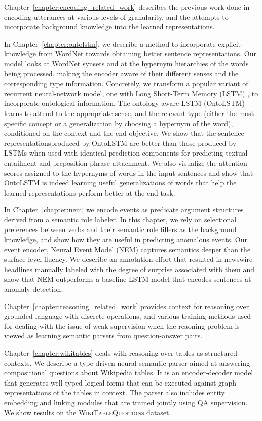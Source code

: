 Chapter~\ref{chapter:encoding_related_work} describes the previous work done in encoding utterances
at various levels of granularity, and the attempts to incorporate background knowledge into
the learned representations.

In Chapter~\ref{chapter:ontolstm}, we describe a method to incorporate explicit knowledge from
WordNet towards obtaining better sentence representations. Our model looks at WordNet synsets and at
the hypernym hierarchies of the words being processed, making the encoder aware of their different
senses and the corresponding type information. Concretely, we transform a popular variant of
recurrent neural-network model, one with Long Short-Term Memory (LSTM) \citep{hochreiter1997long},
to incorporate ontological information.  The ontology-aware LSTM (OntoLSTM) learns to attend to the
appropriate sense, and the relevant type (either the most specific concept or a generalization by
choosing a hypernym of the word), conditioned on the context and the end-objective. We show that the
sentence representationsproduced by OntoLSTM are better than those produced by LSTMs when used with
identical prediction components for predicting textual entailment and preposition phrase attachment.
We also visualize the attention scores assigned to the hypernyms of words in the input sentences and
show that OntoLSTM is indeed learning useful generalizations of words that help the learned
representations perform better at the end task.

In Chapter~\ref{chapter:nem} we encode events as predicate argument structures derived from a
semantic role labeler.  In this chapter, we rely on selectional preferences between verbs and their
semantic role fillers as the background knowledge, and show how they are useful in predicting
anomalous events.  Our event encoder, Neural Event Model (NEM) captures semantics deeper than the
surface-level fluency. We describe an annotation effort that resulted in newswire headlines manually
labeled with the degree of surprise associated with them and show that NEM outperforms a baseline
LSTM model that encodes sentences at anomaly detection. 

Chapter~\ref{chapter:reasoning_related_work} provides context for reasoning over grounded language
with discrete operations, and various training methods used for dealing with the issue of weak
supervision when the reaoning problem is viewed as learning semantic parsers from question-answer
pairs.

Chapter~\ref{chapter:wikitables} deals with reasoning over tables as structured contexts. We
describe a type-driven neural semantic parser aimed at answering compositional questions about
Wikipedia tables. It is an encoder-decoder model that generates well-typed logical forms that can be
executed against graph representations of the tables in context. The parser also includes entity
embedding and linking modules that are trained jointly using QA supervision. We show results on 
the \textsc{WikiTableQuestions} dataset.

